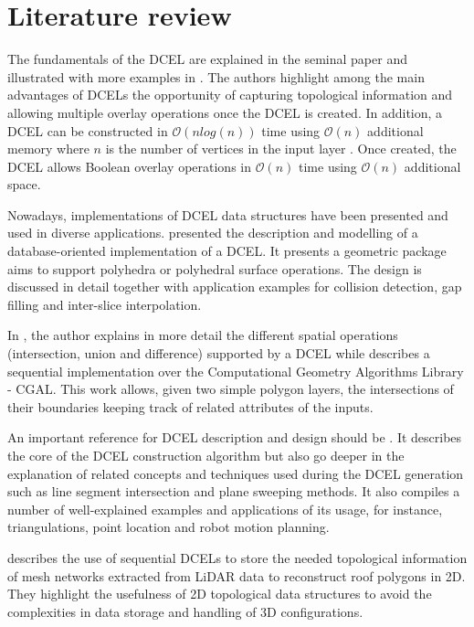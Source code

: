 \section{Literature review}
The fundamentals of the DCEL are explained in the seminal paper \cite{muller_finding_1978} and illustrated with more examples in \cite{preparata_computational_1985}.  The authors highlight among the main advantages of DCELs the opportunity of capturing topological information and allowing multiple overlay operations once the DCEL is created.  In addition, a DCEL can be constructed in $\mathcal{O}(n log(n))$ time using $\mathcal{O}(n)$ additional memory where $n$ is the number of vertices in the input layer \cite{freiseisen_colored_1998}. Once created, the DCEL allows Boolean overlay operations in $\mathcal{O}(n)$ time using $\mathcal{O}(n)$ additional space. 

Nowadays, implementations of DCEL data structures have been presented and used in diverse applications.  \cite{barequet_dcel_1998} presented the description and modelling of a database-oriented implementation of a DCEL. It presents a geometric package aims to support polyhedra or polyhedral surface operations.  The design is discussed in detail together with application examples for collision detection, gap filling and inter-slice interpolation.

In \cite{freiseisen_colored_1998}, the author explains in more detail the different spatial operations (intersection, union and difference) supported by a DCEL while describes a sequential implementation over the Computational Geometry Algorithms Library - CGAL.  This work allows, given two simple polygon layers, the intersections of their boundaries keeping track of related attributes of the inputs.  

An important reference for DCEL description and design should be \cite{berg_computational_2008}.  It describes the core of the DCEL construction algorithm but also go deeper in the explanation of related concepts and techniques used during the DCEL generation such as line segment intersection and plane sweeping methods.  It also compiles a number of well-explained examples and applications of its usage, for instance, triangulations, point location and robot motion planning.

\cite{boltcheva_topological-based_2020} describes the use of sequential DCELs to store the needed topological information of mesh networks extracted from LiDAR data to reconstruct roof polygons in 2D.  They highlight the usefulness of 2D topological data structures to avoid the complexities in data storage and handling of 3D configurations.

